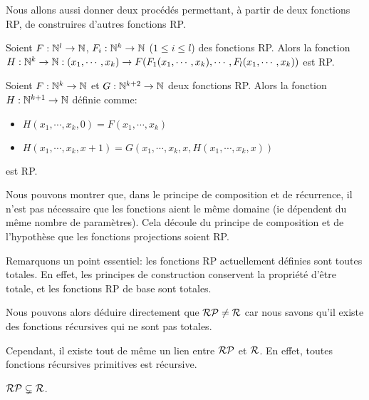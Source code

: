 \vspace{5mm}

Nous allons aussi donner deux procédés permettant, à partir de deux fonctions
RP, de construires d'autres fonctions RP.

\begin{definition} 
	Soient $F : \mathbb{N}^{l} \rightarrow \mathbb{N}$,
	$F_{i} : \mathbb{N}^{k} \rightarrow \mathbb{N}$ ($1 \leq i \leq l$) des
	fonctions RP.
	Alors la fonction $H : \mathbb{N}^{k} \rightarrow \mathbb{N} : (x_{1}, \cdots,
	x_{k}) \rightarrow F(F_{1}(x_{1}, \cdots, x_{k}), \cdots, F_{l}(x_{1},
	\cdots, x_{k}))$ est RP.
\end{definition}

\begin{definition} 
	Soient $F : \mathbb{N}^{k} \rightarrow \mathbb{N}$ et
	$G : \mathbb{N}^{k + 2} \rightarrow \mathbb{N}$ deux fonctions RP.
	Alors la fonction $H : \mathbb{N}^{k + 1} \rightarrow \mathbb{N}$ définie comme:

	\begin{itemize}
		\item $H(x_{1}, \cdots, x_{k}, 0) = F(x_{1}, \cdots, x_{k})$
		\item $H(x_{1}, \cdots, x_{k}, x + 1) = G(x_{1}, \cdots, x_{k}, x,
			H(x_{1}, \cdots, x_{k}, x))$
	\end{itemize}
	est RP.
\end{definition}

Nous pouvons montrer que, dans le principe de composition et de récurrence, il
n'est pas nécessaire que les fonctions aient le même domaine (ie dépendent du
même nombre de paramètres). Cela découle du principe de composition et de
l'hypothèse que les fonctions projections soient RP.

Remarquons un point essentiel: les fonctions RP actuellement définies sont
toutes totales. En effet, les principes de construction conservent la propriété
d'être totale, et les fonctions RP de base sont totales.

Nous pouvons alors déduire directement que $\mathcal{RP} \neq
\mathcal{R}$ car nous savons qu'il existe des fonctions récursives
qui ne sont pas totales.

Cependant, il existe tout de même un lien entre $\mathcal{RP}$
et $\mathcal{R}$. En effet, toutes fonctions récursives primitives
est récursive.

\begin{proposition}
	$\mathcal{RP} \subsetneq \mathcal{R}$.
\end{proposition}

